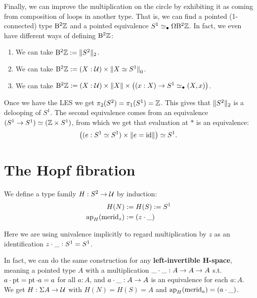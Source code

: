 \documentclass[10pt,oneside,leqno,openright]{memoir}
\begin{document}
\bigskip

Finally, we can improve the multiplication on the circle by exhibiting it as coming from composition of loops in another type. That is, we can find a pointed (1-connected) type $\mathrm{B}^2\mathbb{Z}$ and a pointed equivalence $S^1 \simeq_\bullet \Omega\mathrm{B}^2\mathbb{Z}$.
In fact, we even have different ways of defining $\mathrm{B}^2\mathbb{Z}$:
\begin{enumerate}
\item We can take $\mathrm{B}^2\mathbb{Z} := \lVert S^2\rVert_2$.
\item We can take $\mathrm{B}^2\mathbb{Z} := (X : \mathcal{U}) \times {\lVert X\simeq S^1\rVert}_0$.
\item We can take $\mathrm{B}^2\mathbb{Z} := (X : \mathcal{U}) \times \lVert X\rVert \times
  \bigl((x : X) \to S^1 \simeq_\bullet (X,x)\bigr)$.
\end{enumerate}

Once we have the LES we get $\pi_2(S^2) = \pi_1(S^1) = \mathbb{Z}$. This gives that $\lVert S^2\rVert_2$ is a delooping of $S^1$. The second equivalence comes from an equivalence $(S^1\to S^1) \simeq (\mathbb{Z} \times S^1)$, from which we get that evaluation at $\ast$ is an equivalence:
\[
  \bigl((e : S^1 \simeq S^1) \times \lVert e = \operatorname{id}\rVert\bigr)
  \simeq S^1.
\]

\section{The Hopf fibration}

\begin{definition}
  We define a type family $H : S^2 \to \mathcal{U}$ by induction:
  \begin{align*}
    H(N) &:= H(S) := S^1 \\
    \operatorname{ap}_H(\operatorname{merid}_z) &:= (z \cdot \_)
  \end{align*}
\end{definition}
Here we are using univalence implicitly to regard multiplication by $z$ as an identification $z \cdot\_:S^1 = S^1$.

In fact, we can do the same construction for any \textbf{left-invertible H-space},
meaning a pointed type $A$ with a multiplication $\_\cdot\_:A\to A\to A$ s.t.\
$a\cdot\operatorname{pt} = \operatorname{pt}\cdot a=a$ for all $a:A$, and $a\cdot\_ : A \to A$ is an equivalence for each $a:A$. We get $H : \Sigma A \to \mathcal{U}$
with $H(N) = H(S) = A$ and $\operatorname{ap}_H(\operatorname{merid}_a) = (a\cdot\_)$.
\end{document}
